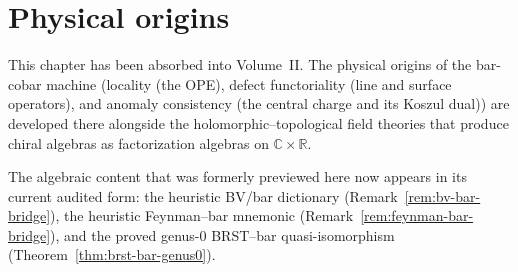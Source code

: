 \chapter{Physical origins}
\label{chap:physical-origins}
\label{rem:programme-origins}

This chapter has been absorbed into Volume~II\@. The physical
origins of the bar-cobar machine (locality (the OPE), defect
functoriality (line and surface operators), and anomaly consistency
(the central charge and its Koszul dual)) are developed there
alongside the holomorphic--topological field theories that produce
chiral algebras as factorization algebras on
$\mathbb{C} \times \mathbb{R}$.

The algebraic content that was formerly previewed here now appears in
its current audited form: the heuristic BV/bar dictionary
\textup{(}Remark~\ref{rem:bv-bar-bridge}\textup{)}, the
heuristic Feynman--bar mnemonic
\textup{(}Remark~\ref{rem:feynman-bar-bridge}\textup{)},
and the proved genus-$0$ BRST--bar quasi-isomorphism
\textup{(}Theorem~\ref{thm:brst-bar-genus0}\textup{)}.
